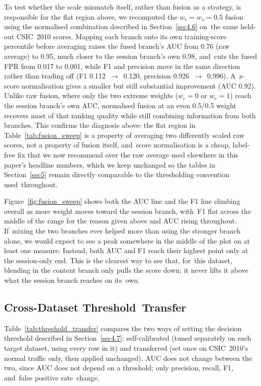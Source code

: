 \documentclass[futureinternet,article,accept,moreauthors]{Definitions/mdpi}
\begin{document}
To test whether the scale mismatch itself, rather than fusion as a strategy, is responsible for the flat region above, we recomputed the $w_c=w_s=0.5$ fusion using the normalised combination described in Section~\ref{sec4.6} on~the same held-out CSIC~2010 scores. Mapping each branch onto its own training-score percentile before averaging raises the fused branch's AUC from 0.76 (raw average) to 0.95, much closer to the session branch's own 0.98, and~cuts the fused FPR from 0.017 to 0.001, while F1 and precision move in the same direction rather than trading off (F1 0.112~$\rightarrow$~0.120, precision 0.926~$\rightarrow$~0.996). A~z-score normalisation gives a smaller but still substantial improvement (AUC 0.92). Unlike raw fusion, where only the two extreme weights ($w_c=0$ or $w_c=1$) reach the session branch's own AUC, normalised fusion at an even 0.5/0.5 weight recovers most of that ranking quality while still combining information from both branches. This confirms the diagnosis above: the flat region in Table~\ref{tab:fusion_sweep} is a property of averaging two differently scaled raw scores, not a property of fusion itself, and~score normalisation is a cheap, label-free fix that we now recommend over the raw average used elsewhere in this paper's headline numbers, which we keep unchanged so the tables in Section~\ref{sec5} remain directly comparable to the thresholding convention used~throughout.






Figure~\ref{fig:fusion_sweep} shows both the AUC line and the F1 line climbing overall as more weight moves toward the session branch, with~F1 flat across the middle of the range for the reason given above and AUC rising throughout. If~mixing the two branches ever helped more than using the stronger branch alone, we would expect to see a peak somewhere in the middle of the plot on at least one measure. Instead, both AUC and F1 reach their highest point only at the session-only end. This is the clearest way to see that, for~this dataset, blending in the content branch only pulls the score down; it never lifts it above what the session branch reaches on its~own.

\subsection{Cross-Dataset Threshold~Transfer} \label{sec5.4}

Table~\ref{tab:threshold_transfer} compares the two ways of setting the decision threshold described in \mbox{Section~\ref{sec4.7}}: self-calibrated (tuned separately on each target dataset, using every row in it) and transferred (set once on CSIC~2010's normal traffic only, then applied unchanged). AUC does not change between the two, since AUC does not depend on a threshold; only precision, recall, F1, and~false positive rate~change.
\end{document}
